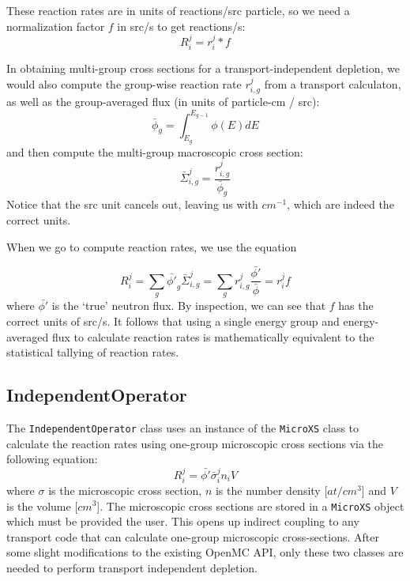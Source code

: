        These reaction rates are in units of reactions/src particle, so we need
        a normalization factor $f$ in src/s to get reactions/s:
        \begin{equation}
            R^j_i = r^j_i * f
        \end{equation}

        In obtaining multi-group cross sections for a transport-independent
        depletion, we would also compute the group-wise reaction rate
        $r^j_{i,g}$ from a transport calculaton, as well as the group-averaged
        flux (in units of particle-cm / src):
        \begin{equation}
            \bar{\phi}_{g} = \int_{E_{g}}^{E_{g-1}} \phi(E) dE
        \end{equation}
        and then compute the multi-group macroscopic cross section:
        \begin{equation}
            \bar{\Sigma}^j_{i,g} = \frac{r^j_{i,g}}{\bar{\phi}_{g}}
        \end{equation}
        Notice that the src unit cancels out, leaving us with $cm^{-1}$, which
        are indeed the correct units.

        When we go to compute reaction rates, we use the equation 

        \begin{equation}
            R^j_i = \sum_{g} \bar{\phi'}_{g} \bar\Sigma^j_{i,g} = \sum_{g}
            r^j_{i,g}\frac{\bar{\phi'}}{\bar{\phi}} = r^j_i f
        \end{equation}
        where $\bar{\phi'}$ is the `true' neutron flux. By inspection, we can
        see that $f$ has the correct units of src/s. It follows that using a
        single energy group and energy-averaged flux to calculate reaction rates
        is mathematically equivalent to the statistical tallying of reaction
        rates.

            
    \subsection{IndependentOperator}
        The \verb.IndependentOperator. class uses an instance of the
        \verb.MicroXS. class to calculate the reaction rates using one-group
        microscopic cross sections via the following equation:
        \begin{equation}
            R^j_i = \bar{\phi'} \bar{\sigma}^j_i n_i V
        \end{equation}
        where $\sigma$ is the microscopic cross section, $n$ is the number
        density [$at/cm^3$] and $V$ is the volume [$cm^3$]. The microscopic
        cross sections are stored in a \verb.MicroXS. object which must be
        provided the user. This opens up indirect coupling to any transport code
        that can calculate one-group microscopic cross-sections. After some
        slight modifications to the existing OpenMC API, only these two classes
        are needed to perform transport independent depletion.

